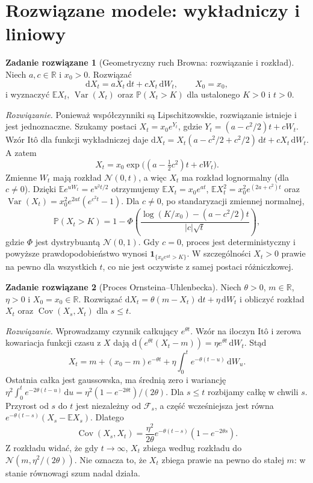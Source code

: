 \documentclass[11pt,a4paper,oneside]{report}
\numberwithin{equation}{chapter}
\theoremstyle{plain}
\theoremstyle{definition}
\newtheorem{zadanie}{Zadanie rozwiązane}[chapter]
\theoremstyle{remark}
\newcommand{\R}{\mathbb{R}}
\newcommand{\Prob}{\mathbb{P}}
\newcommand{\E}{\mathbb{E}}
\newcommand{\Var}{\operatorname{Var}}
\newcommand{\Cov}{\operatorname{Cov}}
\newcommand{\calF}{\mathcal{F}}
\newcommand{\ind}[1]{\mathbf{1}_{#1}}
\newcommand{\dd}{\mathrm{d}}
\newcommand{\Normal}{\mathcal{N}}
\begin{document}
\section{Rozwiązane modele: wykładniczy i liniowy}\label{sec:volIII:05:07}
\begin{zadanie}[Geometryczny ruch Browna: rozwiązanie i rozkład]
\label{zad:gbm}
Niech $a,c\in\R$ i $x_0>0$. Rozwiązać
\[
\dd X_t=aX_t\,\dd t+cX_t\,\dd W_t,
\qquad X_0=x_0,
\]
i wyznaczyć $\E X_t$, $\Var(X_t)$ oraz
$\Prob(X_t>K)$ dla ustalonego $K>0$ i $t>0$.

\emph{Rozwiązanie.} Ponieważ współczynniki są
Lipschitzowskie, rozwiązanie istnieje i jest jednoznaczne.
Szukamy postaci $X_t=x_0e^{Y_t}$, gdzie
$Y_t=(a-c^2/2)t+cW_t$. Wzór Itô dla funkcji
wykładniczej daje
$\dd X_t=X_t(a-c^2/2+c^2/2)\,\dd t+cX_t\,\dd W_t$.
A zatem
\[
X_t=x_0\exp\bigl((a-\tfrac12c^2)t+cW_t\bigr).
\tag{5.7}\label{eq:gbm-solution}
\]
Zmienne $W_t$ mają rozkład $\Normal(0,t)$, a więc
$X_t$ ma rozkład lognormalny (dla $c\ne0$).
Dzięki $\E e^{uW_t}=e^{u^2t/2}$ otrzymujemy
$\E X_t=x_0e^{at}$,
$\E X_t^2=x_0^2e^{(2a+c^2)t}$ oraz
$\Var(X_t)=x_0^2e^{2at}(e^{c^2t}-1)$.
Dla $c\ne0$, po standaryzacji zmiennej normalnej,
\[
\Prob(X_t>K)=1-\Phi\!\left(
\frac{\log(K/x_0)-(a-c^2/2)t}{|c|\sqrt t}\right),
\]
gdzie $\Phi$ jest dystrybuantą $\Normal(0,1)$.
Gdy $c=0$, proces jest deterministyczny i powyższe
prawdopodobieństwo wynosi $\ind{\{x_0e^{at}>K\}}$.
W szczególności $X_t>0$ prawie na pewno dla wszystkich $t$,
co nie jest oczywiste z samej postaci różniczkowej.
\end{zadanie}

\begin{zadanie}[Proces Ornsteina--Uhlenbecka]
\label{zad:ou}
Niech $\theta>0$, $m\in\R$, $\eta>0$ i
$X_0=x_0\in\R$. Rozwiązać
$\dd X_t=\theta(m-X_t)\,\dd t+\eta\,\dd W_t$
i obliczyć rozkład $X_t$ oraz $\Cov(X_s,X_t)$ dla $s\le t$.

\emph{Rozwiązanie.} Wprowadzamy czynnik całkujący
$e^{\theta t}$. Wzór na iloczyn Itô i zerowa
kowariacja funkcji czasu z $X$ dają
$\dd(e^{\theta t}(X_t-m))=\eta e^{\theta t}\,\dd W_t$.
Stąd
\[
X_t=m+(x_0-m)e^{-\theta t}
+\eta\int_0^t e^{-\theta(t-u)}\,\dd W_u.
\tag{5.8}\label{eq:ou-solution}
\]
Ostatnia całka jest gaussowska, ma średnią zero
i wariancję $\eta^2\int_0^t e^{-2\theta(t-u)}\,\dd u
=\eta^2(1-e^{-2\theta t})/(2\theta)$.
Dla $s\le t$ rozbijamy całkę w chwili $s$.
Przyrost od $s$ do $t$ jest niezależny od $\calF_s$,
a część wcześniejsza jest równa
$e^{-\theta(t-s)}(X_s-\E X_s)$. Dlatego
\[
\Cov(X_s,X_t)=\frac{\eta^2}{2\theta}
 e^{-\theta(t-s)}(1-e^{-2\theta s}).
\]
Z rozkładu widać, że gdy $t\to\infty$,
$X_t$ zbiega według rozkładu do
$\Normal(m,\eta^2/(2\theta))$.
Nie oznacza to, że $X_t$ zbiega prawie na pewno
do stałej $m$: w stanie równowagi szum nadal działa.
\end{zadanie}
\end{document}
